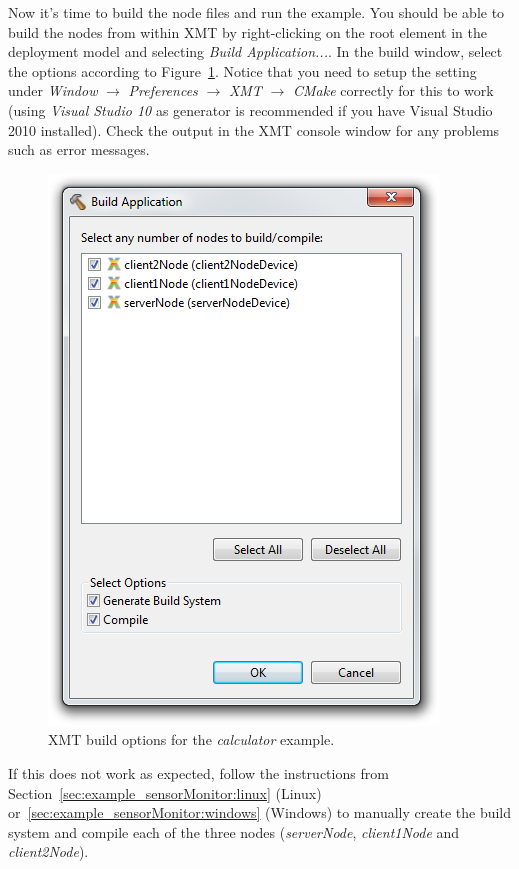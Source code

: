 Now it's time to build the node files and run the example.
%
You should be able to build the nodes from within XMT by right-clicking on the root element in the deployment model and selecting \emph{Build Application...}.
In the build window, select the options according to Figure~\ref{fig:xmt_calculator_buildWindow}.
Notice that you need to setup the setting under \emph{Window} $\rightarrow$ \emph{Preferences} $\rightarrow$ \emph{XMT} $\rightarrow$ \emph{CMake}
correctly for this to work (using \emph{Visual Studio 10} as generator is recommended if you have Visual Studio 2010 installed).
Check the output in the XMT console window for any problems such as error messages.

\begin{figure}[htpb]
	\centering
	\includegraphics[scale=0.75]{figures/xmt_calculator_buildWindow.png}
	\caption{XMT build options for the \emph{calculator} example.}
	\label{fig:xmt_calculator_buildWindow}
\end{figure}

If this does not work as expected, follow the instructions from Section~\ref{sec:example_sensorMonitor:linux} (Linux)
or~\ref{sec:example_sensorMonitor:windows} (Windows) to manually create the build system and compile each of the three nodes
(\emph{serverNode}, \emph{client1Node} and \emph{client2Node}).

